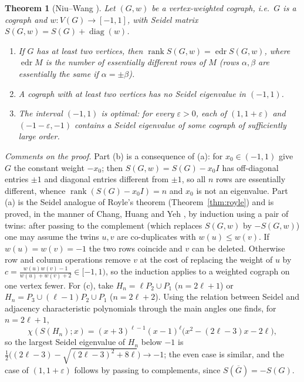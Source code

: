 \documentclass[11pt]{article}
\theoremstyle{plain}
\newtheorem{theorem}{Theorem}[section]
\theoremstyle{definition}
\theoremstyle{remark}
\begin{document}
	\begin{theorem}[Niu--Wang \cite{NiuWang2024}]
		\label{thm:NW}
		Let $(G,w)$ be a \emph{vertex-weighted cograph}, i.e.\ $G$ is a cograph and $w:V(G)\to[-1,1]$, with Seidel matrix $S(G,w)=S(G)+\operatorname{diag}(w)$.
		\begin{enumerate}
			\item[\rm(a)] If $G$ has at least two vertices, then $\operatorname{rank}S(G,w)=\operatorname{edr}S(G,w)$, where $\operatorname{edr}M$ is the number of \emph{essentially different} rows of $M$ (rows $\alpha,\beta$ are essentially the same if $\alpha=\pm\beta$).
			\item[\rm(b)] A cograph with at least two vertices has no Seidel eigenvalue in $(-1,1)$.
			\item[\rm(c)] The interval $(-1,1)$ is optimal: for every $\varepsilon>0$, each of $(1,1+\varepsilon)$ and $(-1-\varepsilon,-1)$ contains a Seidel eigenvalue of some cograph of sufficiently large order.
		\end{enumerate}
	\end{theorem}
	
	\emph{Comments on the proof.} Part (b) is a consequence of (a): for $x_0\in(-1,1)$ give $G$ the constant weight $-x_0$; then $S(G,w)=S(G)-x_0I$ has off-diagonal entries $\pm1$ and diagonal entries different from $\pm1$, so all $n$ rows are essentially different, whence $\operatorname{rank}(S(G)-x_0I)=n$ and $x_0$ is not an eigenvalue. Part (a) is the Seidel analogue of Royle's theorem (Theorem~\ref{thm:royle}) and is proved, in the manner of Chang, Huang and Yeh \cite{ChangHuangYeh2008}, by induction using a pair of twins: after passing to the complement (which replaces $S(G,w)$ by $-S(G,w)$) one may assume the twins $u,v$ are co-duplicates with $w(u)\le w(v)$. If $w(u)=w(v)=-1$ the two rows coincide and $v$ can be deleted. Otherwise row and column operations remove $v$ at the cost of replacing the weight of $u$ by $c=\frac{w(u)w(v)-1}{w(u)+w(v)+2}\in[-1,1)$, so the induction applies to a weighted cograph on one vertex fewer. For (c), take $H_n=\ell P_2\cup P_1$ ($n=2\ell+1$) or $H_n=P_3\cup(\ell-1)P_2\cup P_1$ ($n=2\ell+2$). Using the relation between Seidel and adjacency characteristic polynomials through the main angles \cite[Prop.~2.1.4]{CvetkovicRowlinsonSimic2010} one finds, for $n=2\ell+1$,
	\[
	\chi(S(H_n);x)=(x+3)^{\ell-1}(x-1)^{\ell}\bigl(x^2-(2\ell-3)x-2\ell\bigr),
	\]
	so the largest Seidel eigenvalue of $H_n$ below $-1$ is $\tfrac12\bigl((2\ell-3)-\sqrt{(2\ell-3)^2+8\ell}\bigr)\to-1$; the even case is similar, and the case of $(1,1+\varepsilon)$ follows by passing to complements, since $S(\overline G)=-S(G)$.
	
\end{document}
